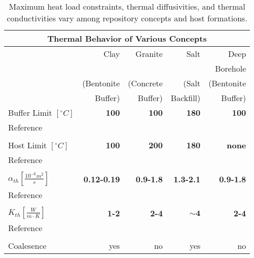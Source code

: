 %
\begin{table}[h!]
  \centering
  \footnotesize{
  \begin{tabular}{|l|r|r|r|r|}
    \multicolumn{5}{c}{\textbf{Thermal Behavior of Various Concepts}}\\
    \hline
            & Clay & Granite & Salt & Deep \\ 
            & & & & Borehole \\ 
            & (Bentonite & (Concrete & (Salt & (Bentonite\\ 
            & Buffer) & Buffer) & Backfill) & Buffer) \\ 
    \hline
    Buffer Limit $[^{\circ}C]$ & \textbf{100}  & \textbf{100}  & \textbf{180} & \textbf{100}  \\ 
    Reference
    & \cite{hardin_generic_2011}   
    & \cite{von_lensa_red-impact_2008}   
    & \cite{von_lensa_red-impact_2008,brewitz_long-term_2002}   
    & \cite{von_lensa_red-impact_2008}  \\ 
    &      &      &     &      \\
    Host Limit $[^{\circ}C]$   & \textbf{100}  & \textbf{200}  & \textbf{180} & \textbf{none} \\ 
    Reference                     
    & \cite{andra_argile:_2005}   
    & \cite{von_lensa_red-impact_2008}   
    & \cite{hardin_generic_2011}   
    & \cite{hardin_generic_2011, brady_deep_2009}   \\
    &      &      &     &      \\
    $\alpha_{th} [\frac{10^{-6}m^2}{s}]$ & \textbf{0.12-0.19} & \textbf{0.9-1.8} & \textbf{1.3-2.1} &\textbf{ 0.9-1.8} \\ 
    Reference                     
    & \cite{tikhonravova_effect_2007} 
    & \cite{durham_thermal_1987,hardin_generic_2011,kim_thermal_2007}     
    & \cite{hardin_generic_2011,nieland_storage_2001}   
    & \cite{durham_thermal_1987,hardin_generic_2011,kim_thermal_2007}   \\ 
    &      &      &     &      \\
    $K_{th} [\frac{W}{m{\cdot}K}]$ & \textbf{1-2} & \textbf{2-4} & $\mathbf{\sim4}$  & \textbf{2-4} \\ 
    Reference                     
    & \cite{hardin_generic_2011,tikhonravova_effect_2007}    
    & \cite{hardin_generic_2011,kim_thermal_2007,surma_porosity_2003,ab_long-term_2006}    
    & \cite{hardin_generic_2011,nieland_storage_2001}
    & \cite{hardin_generic_2011,kim_thermal_2007,surma_porosity_2003}\\ 
    &      &      &     &      \\
    Coalesence & yes & no & yes & no \\ 
    \hline
  \end{tabular}
  \caption[Models for Heat Transport for Various Geologies]{Maximum heat load constraints, thermal 
  diffusivities, and thermal conductivities vary among repository concepts and host formations. }
  \label{tab:heat_tab}
  }
\end{table}
